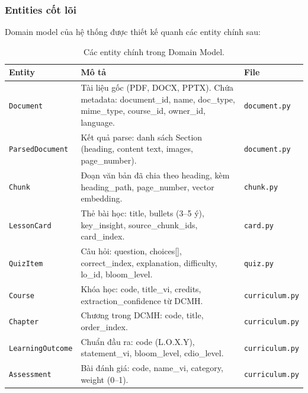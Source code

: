 \subsubsection{Entities cốt lõi}

Domain model của hệ thống được thiết kế quanh các entity chính sau:

\begin{table}[H]
    \centering
    \caption{Các entity chính trong Domain Model.}
    \label{tab:domain-entities}
    \begin{tabular}{p{3.5cm}p{8cm}p{3cm}}
        \toprule
        \textbf{Entity} & \textbf{Mô tả} & \textbf{File} \\
        \midrule
        \texttt{Document}
            & Tài liệu gốc (PDF, DOCX, PPTX). Chứa metadata:
              document\_id, name, doc\_type, mime\_type,
              course\_id, owner\_id, language.
            & \texttt{document.py} \\
        \texttt{ParsedDocument}
            & Kết quả parse: danh sách Section (heading,
              content text, images, page\_number).
            & \texttt{document.py} \\
        \texttt{Chunk}
            & Đoạn văn bản đã chia theo heading, kèm
              heading\_path, page\_number, vector embedding.
            & \texttt{chunk.py} \\
        \texttt{LessonCard}
            & Thẻ bài học: title, bullets (3--5 ý), key\_insight,
              source\_chunk\_ids, card\_index.
            & \texttt{card.py} \\
        \texttt{QuizItem}
            & Câu hỏi: question, choices[], correct\_index,
              explanation, difficulty, lo\_id, bloom\_level.
            & \texttt{quiz.py} \\
        \texttt{Course}
            & Khóa học: code, title\_vi, credits,
              extraction\_confidence từ DCMH.
            & \texttt{curriculum.py} \\
        \texttt{Chapter}
            & Chương trong DCMH: code, title, order\_index.
            & \texttt{curriculum.py} \\
        \texttt{LearningOutcome}
            & Chuẩn đầu ra: code (L.O.X.Y), statement\_vi,
              bloom\_level, cdio\_level.
            & \texttt{curriculum.py} \\
        \texttt{Assessment}
            & Bài đánh giá: code, name\_vi, category,
              weight (0--1).
            & \texttt{curriculum.py} \\
        \bottomrule
    \end{tabular}
\end{table}

